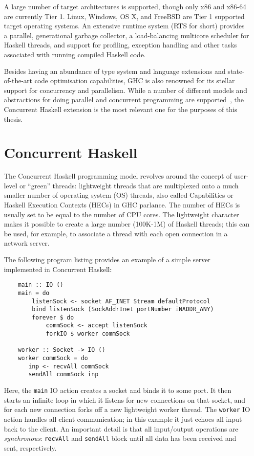\documentclass[a4paper,11pt,oneside]{report}
\begin{document}
A large number of target architectures is supported, though only x86 and x86-64
are currently Tier 1. Linux, Windows, OS X, and FreeBSD are Tier 1 supported
target operating systems. An extensive runtime system (RTS for short) provides a
parallel, generational garbage collector, a load-balancing multicore scheduler
for Haskell threads, and support for profiling, exception handling and other
tasks associated with running compiled Haskell code.

Besides having an abundance of type system and language extensions and
state-of-the-art code optimisation capabilities, GHC is also renowned for its
stellar support for concurrency and parallelism. While a number of different
models and abstractions for doing parallel and concurrent programming are
supported~\cite{bib:marlow2013}, the Concurrent Haskell extension is the most
relevant one for the purposes of this thesis.

\section{Concurrent Haskell}

The Concurrent Haskell programming model revolves around the concept of
user-level or ``green'' threads: lightweight threads that are multiplexed onto a
much smaller number of operating system (OS) threads, also called Capabilities
or Haskell Execution Contexts (HECs) in GHC parlance. The number of HECs is
usually set to be equal to the number of CPU cores. The lightweight character
makes it possible to create a large number (100K-1M) of Haskell threads; this
can be used, for example, to associate a thread with each open connection in a
network server.

The following program listing provides an example of a simple server implemented
in Concurrent Haskell:

\begin{verbatim}
    main :: IO ()
    main = do
        listenSock <- socket AF_INET Stream defaultProtocol
        bind listenSock (SockAddrInet portNumber iNADDR_ANY)
        forever $ do
            commSock <- accept listenSock
            forkIO $ worker commSock

    worker :: Socket -> IO ()
    worker commSock = do
       inp <- recvAll commSock
       sendAll commSock inp

\end{verbatim}

Here, the \texttt{main} IO action creates a socket and binds it to some port. It
then starts an infinite loop in which it listens for new connections on that
socket, and for each new connection forks off a new lightweight worker
thread. The \texttt{worker} IO action handles all client communication; in this
example it just echoes all input back to the client. An important detail is that
all input/output operations are \textit{synchronous}: \texttt{recvAll} and
\texttt{sendAll} block until all data has been received and sent, respectively.
\end{document}
